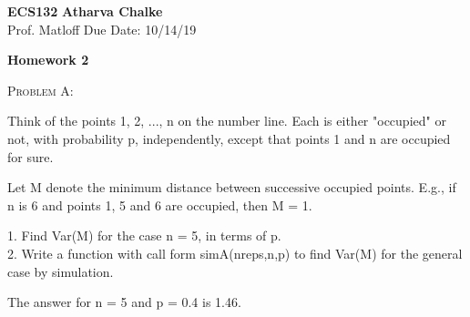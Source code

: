 \documentclass[12pt]{article}
\newenvironment{statement}[1]
{\begin{mdframed}[linewidth=0.6pt]
        \textsc{ #1:}

}
    {\end{mdframed}}
\begin{document}
\noindent
\textbf{ECS132} \hfill \textbf{Atharva Chalke} \\
\normalsize Prof. Matloff \hfill Due Date: 10/14/19 \\


\begin{center}
\textbf{Homework 2}
\end{center}

\begin{statement}{Problem A}
Think of the points 1, 2, ..., n on the number line. Each is either "occupied" or not, with probability p, independently, except that points 1 and n are occupied for sure.

Let M denote the minimum distance between successive occupied points. E.g., if n is 6 and points 1, 5 and 6 are occupied, then M = 1.

1. Find Var(M) for the case n = 5, in terms of p.\\
2. Write a function with call form
simA(nreps,n,p)
to find Var(M) for the general case by simulation.

The answer for n = 5 and p = 0.4 is 1.46.
\end{statement}

\end{document}
